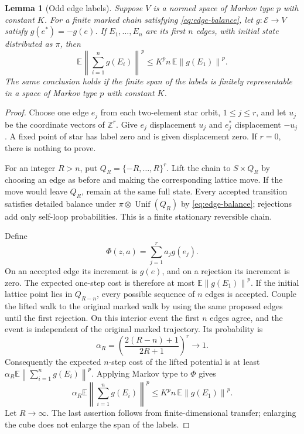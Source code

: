 \documentclass[11pt]{article}
\newtheorem{lemma}[theorem]{Lemma}
\theoremstyle{definition}
\theoremstyle{remark}
\newcommand{\Z}{\mathbb Z}
\newcommand{\E}{\mathbb E}
\newcommand{\norm}[1]{\left\lVert #1\right\rVert}
\begin{document}
\begin{lemma}[Odd edge labels]\label{lem:edge-labels}
Suppose $V$ is a normed space of Markov type $p$ with constant $K$.
For a finite marked chain satisfying \eqref{eq:edge-balance}, let
$g:\mathcal E\to V$ satisfy $g(e^*)=-g(e)$.
If $E_1,\ldots,E_n$ are its first $n$ edges, with initial state distributed
as $\pi$, then
\begin{equation}\label{eq:odd-markov}
 \E\norm{\sum_{i=1}^n g(E_i)}^p
 \leq K^p n\,\E\norm{g(E_1)}^p.
\end{equation}
The same conclusion holds if the finite span of the labels is finitely
representable in a space of Markov type $p$ with constant $K$.
\end{lemma}

\begin{proof}
Choose one edge $e_j$ from each two-element star orbit, $1\leq j\leq r$,
and let $u_j$ be the coordinate vectors of $\Z^r$.
Give $e_j$ displacement $u_j$ and $e_j^*$ displacement $-u_j$.
A fixed point of star has label zero and is given displacement zero.
If $r=0$, there is nothing to prove.

For an integer $R>n$, put $Q_R=\{-R,\ldots,R\}^r$.
Lift the chain to $S\times Q_R$ by choosing an edge as before and making
the corresponding lattice move. If the move would leave $Q_R$, remain
at the same full state. Every accepted transition satisfies detailed
balance under $\pi\otimes\operatorname{Unif}(Q_R)$ by
\eqref{eq:edge-balance}; rejections add only self-loop probabilities.
This is a finite stationary reversible chain.

Define
\[
 \Phi(z,a)=\sum_{j=1}^r a_jg(e_j).
\]
On an accepted edge its increment is $g(e)$, and on a rejection its
increment is zero. The expected one-step cost is therefore at most
$\E\norm{g(E_1)}^p$.
If the initial lattice point lies in $Q_{R-n}$, every possible sequence
of $n$ edges is accepted. Couple the lifted walk to the original marked
walk by using the same proposed edges until the first rejection. On this
interior event the first $n$ edges agree, and the event is independent of
the original marked trajectory. Its probability is
\[
 \alpha_R=\left(\frac{2(R-n)+1}{2R+1}\right)^r\longrightarrow1.
\]
Consequently the expected $n$-step cost of the lifted potential is at
least $\alpha_R\E\norm{\sum_{i=1}^n g(E_i)}^p$.
Applying Markov type to $\Phi$ gives
\[
 \alpha_R\E\norm{\sum_{i=1}^n g(E_i)}^p
 \leq K^p n\,\E\norm{g(E_1)}^p.
\]
Let $R\to\infty$. The last assertion follows from finite-dimensional
transfer; enlarging the cube does not enlarge the span of the labels.
\end{proof}
\end{document}
